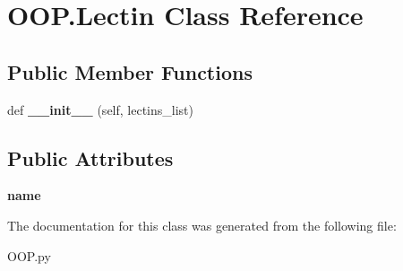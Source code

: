 \hypertarget{class_o_o_p_1_1_lectin}{}\section{O\+O\+P.\+Lectin Class Reference}
\label{class_o_o_p_1_1_lectin}
\subsection*{Public Member Functions}
\begin{DoxyCompactItemize}
\item 
\mbox{\label{class_o_o_p_1_1_lectin_a7debe673b7619fce773559deea7a0c52}} 
def {\bfseries \+\_\+\+\_\+init\+\_\+\+\_\+} (self, lectins\+\_\+list)
\end{DoxyCompactItemize}
\subsection*{Public Attributes}
\begin{DoxyCompactItemize}
\item 
\mbox{\label{class_o_o_p_1_1_lectin_af98ecd1e900a4be8f49ad0f0f1739fd1}} 
{\bfseries name}
\end{DoxyCompactItemize}


The documentation for this class was generated from the following file\+:\begin{DoxyCompactItemize}
\item 
O\+O\+P.\+py\end{DoxyCompactItemize}
